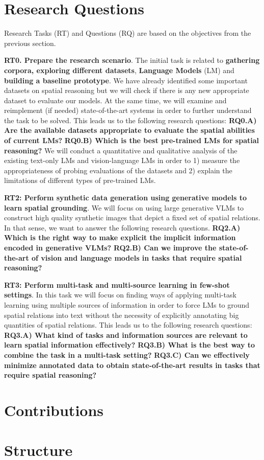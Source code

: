 \section{Research Questions}

Research Tasks (RT) and Questions (RQ) are based on the objectives from the previous section.

\textbf{RT0. Prepare the research scenario}. The initial task is related to \textbf{gathering corpora, exploring different datasets}, \textbf{Language Models} (LM) and \textbf{building a baseline prototype}. We have already identified some important datasets on spatial reasoning but we will check if there is any new appropriate dataset to evaluate our models. At the same time, we will examine and reimplement (if needed) state-of-the-art systems in order to further understand the task to be solved. This leads us to the following research questions: \textbf{RQ0.A) Are the available datasets appropriate to evaluate the spatial abilities of current LMs?} \textbf{RQ0.B) Which is the best pre-trained LMs for spatial reasoning?} We will conduct a quantitative and qualitative analysis of the existing text-only LMs and vision-language LMs in order to 1) measure the appropriateness of probing evaluations of the datasets and 2) explain the limitations of different types of pre-trained LMs.

\textbf{RT2: Perform synthetic data generation using generative models to learn spatial grounding}. We will focus on using large generative VLMs to construct high quality synthetic images that depict a fixed set of spatial relations. In that sense, we want to answer the following research questions. \textbf{RQ2.A) Which is the right way to make explicit the implicit information encoded in generative VLMs?} \textbf{RQ2.B) Can we improve the state-of-the-art of vision and language models in tasks that require spatial reasoning?}

\textbf{RT3: Perform multi-task and multi-source learning in few-shot settings}. In this task we will focus on finding ways of applying multi-task learning using multiple sources of information in order to force LMs to ground spatial relations into text without the necessity of explicitly annotating big quantities of spatial relations. This leads us to the following research questions: \textbf{RQ3.A) What kind of tasks and information sources are relevant to learn spatial information effectively?} \textbf{RQ3.B) What is the best way to combine the task in a multi-task setting?} \textbf{RQ3.C) Can we effectively minimize annotated data to obtain state-of-the-art results in tasks that require spatial reasoning?}

\section{Contributions}

\section{Structure}